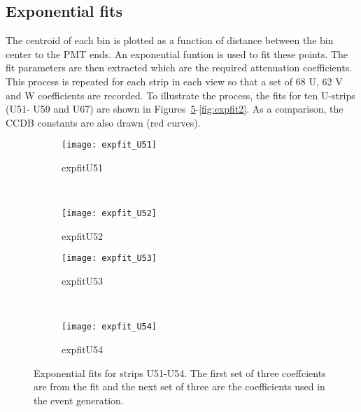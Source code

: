\FloatBarrier
\subsection{Exponential fits}
The centroid of each bin is plotted as a function of distance between the bin center to the PMT ends. An exponential funtion is used
to fit these points. The fit parameters are then extracted which are the required attenuation coefficients. This process is repeated
for each strip in each view so that a set of 68 U, 62 V and W coefficients are recorded. To illustrate the process, the fits for ten 
U-strips (U51- U59 and U67) are shown in Figures~\ref{fig:expfit1}-\ref{fig:expfit2}. As a comparison, the CCDB constants are also 
drawn (red curves).
\begin{figure}[h]
    \centering
    \begin{subfigure}[h]{0.44\textwidth}
        \centering
        \texttt{[image: expfit\_U51]}
        \caption{expfitU51}
        \label{fig:expfit_U51}
    \end{subfigure}
    ~
    \begin{subfigure}[h]{0.44\textwidth}
        \centering
        \texttt{[image: expfit\_U52]}
        \caption{expfitU52}
        \label{fig:expfit_U52}
    \end{subfigure}
    
    \begin{subfigure}[h]{0.44\textwidth}
        \centering
        \texttt{[image: expfit\_U53]}
        \caption{expfitU53}
        \label{fig:expfit_U53}
    \end{subfigure}
    ~
    \begin{subfigure}[h]{0.44\textwidth}
        \centering
        \texttt{[image: expfit\_U54]}
        \caption{expfitU54}
        \label{fig:expfit_U54}
    \end{subfigure}
    \caption{Exponential fits for strips U51-U54. The first set of three coeffcients are from the fit and the next set of three are
     the coefficients used in the event generation.}
    \label{fig:expfit1}
\end{figure}

